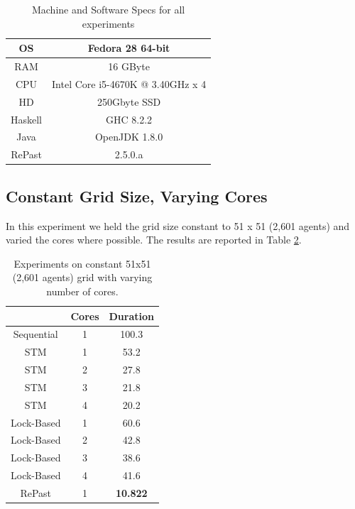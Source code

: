 \begin{table}
	\centering
	\begin{tabular}{ c || c }
		OS & Fedora 28 64-bit \\ \hline
		RAM & 16 GByte \\ \hline
		CPU & Intel Core i5-4670K @ 3.40GHz x 4 \\ \hline
		HD & 250Gbyte SSD \\ \hline
		Haskell & GHC 8.2.2 \\ \hline
		Java & OpenJDK 1.8.0 \\ \hline
		RePast & 2.5.0.a
	\end{tabular}
	
	\caption{Machine and Software Specs for all experiments}
	\label{tab:machine_specs}
\end{table}

\subsection{Constant Grid Size, Varying Cores}
In this experiment we held the grid size constant to 51 x 51 (2,601 agents) and varied the cores where possible. The results are reported in Table \ref{tab:constgrid_varyingcores}.

\begin{table}
	\centering
  	\begin{tabular}{ c || c | c  }
                    & Cores & Duration  \\ \hline \hline 
    	Sequential  & 1     & 100.3     \\ \hline \hline
   		STM         & 1     & 53.2      \\ \hline
   		STM         & 2     & 27.8      \\ \hline
   		STM         & 3     & 21.8      \\ \hline
   		STM         & 4     & 20.2      \\ \hline \hline
   		Lock-Based  & 1     & 60.6      \\ \hline 
   		Lock-Based  & 2     & 42.8      \\ \hline 
   		Lock-Based  & 3     & 38.6      \\ \hline 
   		Lock-Based  & 4     & 41.6      \\ \hline \hline
   		RePast      & 1     & \textbf{10.822} \\ \hline \hline
  	\end{tabular}
  	
  	\caption{Experiments on constant 51x51 (2,601 agents) grid with varying number of cores.}
	\label{tab:constgrid_varyingcores}
\end{table}

